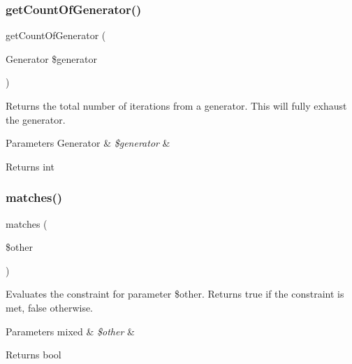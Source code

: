 \subsubsection{\texorpdfstring{get\+Count\+Of\+Generator()}{getCountOfGenerator()}}
{\footnotesize\ttfamily get\+Count\+Of\+Generator (\begin{DoxyParamCaption}\item[{Generator}]{\$generator }\end{DoxyParamCaption})\hspace{0.3cm}{\ttfamily [protected]}}

Returns the total number of iterations from a generator. This will fully exhaust the generator.


\begin{DoxyParams}[1]{Parameters}
Generator & {\em \$generator} & \\
\hline
\end{DoxyParams}
\begin{DoxyReturn}{Returns}
int 
\end{DoxyReturn}
\mbox{\label{class_p_h_p_unit___framework___constraint___count_a9c9c337de483bbdbb9fa249a6c7c9cc5}} 
\subsubsection{\texorpdfstring{matches()}{matches()}}
{\footnotesize\ttfamily matches (\begin{DoxyParamCaption}\item[{}]{\$other }\end{DoxyParamCaption})\hspace{0.3cm}{\ttfamily [protected]}}

Evaluates the constraint for parameter \$other. Returns true if the constraint is met, false otherwise.


\begin{DoxyParams}[1]{Parameters}
mixed & {\em \$other} & \\
\hline
\end{DoxyParams}
\begin{DoxyReturn}{Returns}
bool 
\end{DoxyReturn}
\mbox{\label{class_p_h_p_unit___framework___constraint___count_a5558c5d549f41597377fa1ea8a1cefa3}} 
